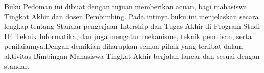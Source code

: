 \begin{abstrak}
Buku Pedoman ini dibuat dengan tujuan memberikan acuan, bagi mahasiswa Tingkat Akhir dan dosen
Pembimbing. Pada intinya buku ini menjelaskan secara lengkap tentang Standar pengerjaan Intership  dan 
Tugas Akhir
di Program Studi D4 Teknik Informatika, dan juga mengatur mekanisme, teknik penulisan, serta
penilaiannya.Dengan demikian diharapkan semua pihak yang terlibat dalam aktivitas Bimbingan Mahasiswa Tingkat Akhir
berjalan lancar dan sesuai dengan standar.
\end{abstrak}